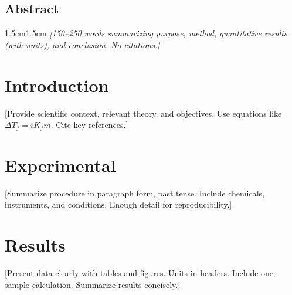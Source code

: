 \makeatletter
{}
\makeatother
\def\LabReportDocOptions{11pt,letterpaper}


\SetLabReportPreparedOn{\today}

\LabReportDocumentBegin

\MakeLabReportCoverPage

\begin{center}
\section*{\centering Abstract}
\begin{adjustwidth}{1.5cm}{1.5cm}
\textit{[150–250 words summarizing purpose, method, quantitative results (with units), and conclusion. No citations.]}
\end{adjustwidth}
\end{center}

\section*{Introduction}
[Provide scientific context, relevant theory, and objectives. Use equations like $\Delta T_f = iK_f m$. Cite key references.\cite{ref1}]

\section*{Experimental}
[Summarize procedure in paragraph form, past tense. Include chemicals, instruments, and conditions. Enough detail for reproducibility.]

\section*{Results}
[Present data clearly with tables and figures. Units in headers. Include one sample calculation. Summarize results concisely.]

